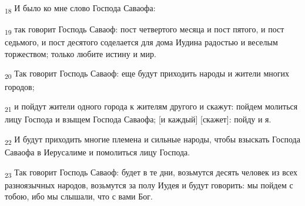 \begin{tcolorbox}
\textsubscript{18} И было ко мне слово Господа Саваофа:
\end{tcolorbox}
\begin{tcolorbox}
\textsubscript{19} так говорит Господь Саваоф: пост четвертого месяца и пост пятого, и пост седьмого, и пост десятого соделается для дома Иудина радостью и веселым торжеством; только любите истину и мир.
\end{tcolorbox}
\begin{tcolorbox}
\textsubscript{20} Так говорит Господь Саваоф: еще будут приходить народы и жители многих городов;
\end{tcolorbox}
\begin{tcolorbox}
\textsubscript{21} и пойдут жители одного города к жителям другого и скажут: пойдем молиться лицу Господа и взыщем Господа Саваофа; [и каждый] [скажет]: пойду и я.
\end{tcolorbox}
\begin{tcolorbox}
\textsubscript{22} И будут приходить многие племена и сильные народы, чтобы взыскать Господа Саваофа в Иерусалиме и помолиться лицу Господа.
\end{tcolorbox}
\begin{tcolorbox}
\textsubscript{23} Так говорит Господь Саваоф: будет в те дни, возьмутся десять человек из всех разноязычных народов, возьмутся за полу Иудея и будут говорить: мы пойдем с тобою, ибо мы слышали, что с вами Бог.
\end{tcolorbox}
